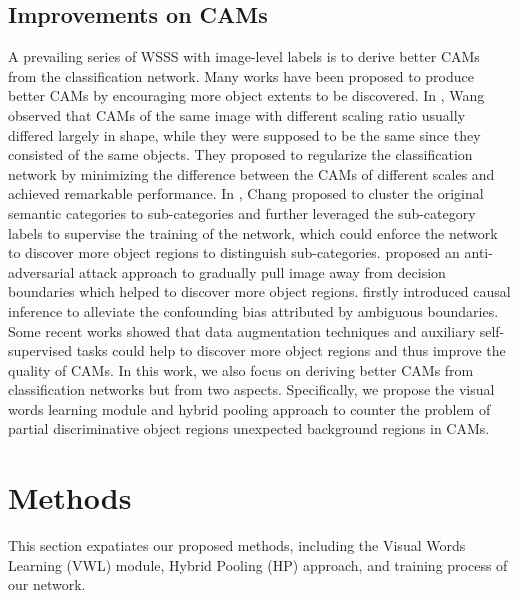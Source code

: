 \subsection{Improvements on CAMs}
\par A prevailing series of WSSS with image-level labels is to derive better CAMs from the classification network. Many works have been proposed to produce better CAMs by encouraging more object extents to be discovered. In \citep{wang2020self}, Wang \etal observed that CAMs of the same image with different scaling ratio usually differed largely in shape, while they were supposed to be the same since they consisted of the same objects. They proposed to regularize the classification network by minimizing the difference between the CAMs of different scales and achieved remarkable performance. In \citep{chang2020weakly}, Chang \etal proposed to cluster the original semantic categories to sub-categories and further leveraged the sub-category labels to supervise the training of the network, which could enforce the network to discover more object regions to distinguish sub-categories. \citep{lee2021anti} proposed an anti-adversarial attack approach to gradually pull image away from decision boundaries which helped to discover more object regions. \citep{zhang2020causal} firstly introduced causal inference \citep{rubin2019essential} to alleviate the confounding bias attributed by ambiguous boundaries. Some recent works showed that data augmentation techniques \citep{chang2020mixup} and auxiliary self-supervised tasks \citep{jo2021puzzle} could help to discover more object regions and thus improve the quality of CAMs. In this work, we also focus on deriving better CAMs from classification networks but from two aspects. Specifically, we propose the visual words learning module and hybrid pooling approach to counter the problem of partial discriminative object regions unexpected background regions in CAMs.



\section{Methods}
\label{methods}

\par This section expatiates our proposed methods, including the Visual Words Learning (VWL) module, Hybrid Pooling (HP) approach, and training process of our network. 

